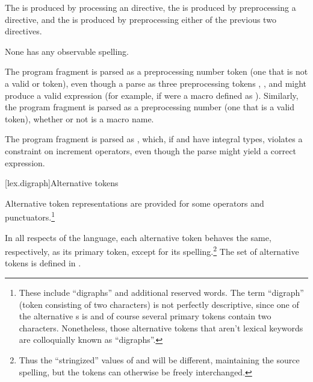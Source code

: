 \documentclass{wg21}
\begin{document}
\pnum
The  is produced
by processing an  directive,
the  is produced
by preprocessing a  directive, and
the  is produced
by preprocessing either of the previous two directives.
\begin{note}
    None has any observable spelling.
\end{note}

\pnum
\begin{example}
    The program fragment  is parsed as a
    preprocessing number token (one that is not a valid
     or  token),
    even though a parse as three preprocessing tokens
    , \tcode{+}, and  might produce a valid expression (for example,
    if  were a macro defined as ). Similarly, the
    program fragment  is parsed as a preprocessing number (one
    that is a valid  token),
    whether or not  is a macro name.
\end{example}

\pnum
\begin{example}
    The program fragment  is parsed as , which, if  and  have integral types,
    violates a constraint on increment operators, even though the parse
     might yield a correct expression.
\end{example}

[lex.digraph]{Alternative tokens}

\pnum
{}%
Alternative token representations are provided for some operators and
punctuators.\footnote{%
    These include ``digraphs'' and additional reserved words. The term
    ``digraph'' (token consisting of two characters) is not perfectly
    descriptive, since one of the alternative s is
    \tcode{\%:\%:} and of course several primary tokens contain two
    characters. Nonetheless, those alternative tokens that aren't lexical
    keywords are colloquially known as ``digraphs''. }

\pnum
In all respects of the language, each alternative token behaves the
same, respectively, as its primary token, except for its spelling.\footnote{Thus the ``stringized'' values of
    \tcode{[} and \tcode{<:} will be different, maintaining the source
    spelling, but the tokens can otherwise be freely interchanged. }
The set of alternative tokens is defined in
.
\end{document}
